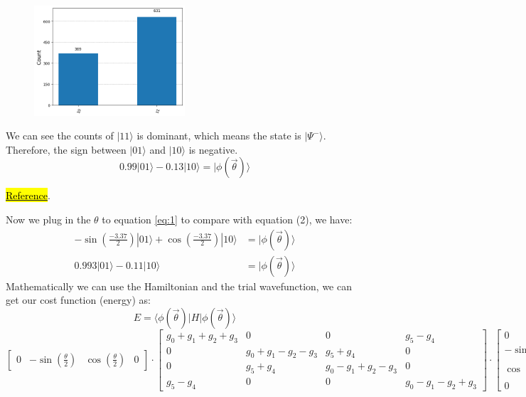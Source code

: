 \documentclass{article}
\begin{document}
\begin{itemize}
    \begin{figure}[H]
        \centering
        \includegraphics[width=0.5\textwidth, height=0.3\textheight]{BellHis.png}
    \end{figure}
    We can see the counts of \(|11\rangle\) is dominant, which means the state is \(|\Psi^-\rangle\). Therefore, the sign between \(|01\rangle\) and \(|10\rangle\) is negative.
    \begin{equation}
        0.99 |01\rangle - 0.13 |10\rangle = |\phi(\vec{\theta}) \rangle
    \end{equation}

    \href{https://grishmaprs.medium.com/measurement-based-quantum-computation-9de426f40856}{\hl{Reference}}.
    

    Now we plug in the \(\theta\) to equation \eqref{eq:1} to compare with equation (2), we have:
    \begin{align*}
        -\sin\left(\frac{-3.37}{2}\right) |01 \rangle + \cos\left(\frac{-3.37}{2}\right) |10 \rangle &= |\phi(\vec{\theta}) \rangle \\
        0.993 |01\rangle  - 0.11 |10\rangle &= |\phi(\vec{\theta}) \rangle
    \end{align*}
    Mathematically we can use the Hamiltonian and the trial wavefunction, we can get our cost function (energy) as: 
     \[E = \langle \phi({\vec{\theta}})| H | \phi(\vec{\theta}) \rangle\]
    \[
    \begin{bmatrix}
        0 & -\sin(\frac{\theta}{2}) & \cos(\frac{\theta}{2}) & 0
    \end{bmatrix}
    \cdot
    \begin{bmatrix}
        g_0 + g_1 + g_2 + g_3 & 0 & 0 & g_5 - g_4\\
        0 & g_0 + g_1 - g_2 - g_3 & g_5 + g_4 & 0\\
        0 & g_5 + g_4 & g_0 - g_1 + g_2 - g_3 & 0\\
        g_5 - g_4 & 0 & 0 & g_0 - g_1 - g_2 +  g_3
    \end{bmatrix}
    \cdot
    \begin{bmatrix}
        0 \\
        - \sin(\frac{\theta}{2}) \\
        \cos(\frac{\theta}{2}) \\
        0
    \end{bmatrix}
    \]


\end{itemize}
\end{document}
